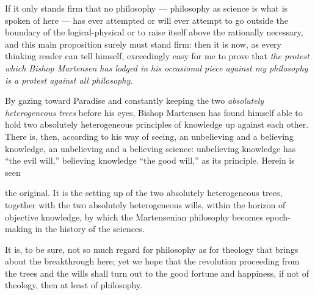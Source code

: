 \documentclass[12pt]{book}
\newcommand{\opage}[1]{\marginnote{\footnotesize\textit{[#1]}}}
\begin{document}
If it only stands firm that no philosophy --- philosophy as science is what is spoken of here --- has ever attempted or will ever attempt to go outside the boundary of the logical-physical or to raise itself above the rationally necessary, and this main proposition surely must stand firm: then it is now, as every thinking reader can tell himself, exceedingly easy for me to prove that \emph{the protest which Bishop Martensen has lodged in his occasional piece against my philosophy is a protest against all philosophy}.

By gazing toward Paradise and constantly keeping the two \emph{absolutely heterogeneous trees} before his eyes, Bishop Martensen has found himself able to hold two absolutely heterogeneous principles of knowledge up against each other. There is, then, according to his way of seeing, an unbelieving and a believing knowledge, an unbelieving and a believing science: unbelieving knowledge has ``the evil will,'' believing knowledge ``the good will,'' as its principle. Herein is seen

\opage{109}\setcounter{footnote}{0}%
the original. It is the setting up of the two absolutely heterogeneous trees, together with the two absolutely heterogeneous wills, within the horizon of objective knowledge, by which the Martensenian philosophy becomes epoch-making in the history of the sciences.

It is, to be sure, not so much regard for philosophy as for theology that brings about the breakthrough here; yet we hope that the revolution proceeding from the trees and the wills shall turn out to the good fortune and happiness, if not of theology, then at least of philosophy.
\end{document}
